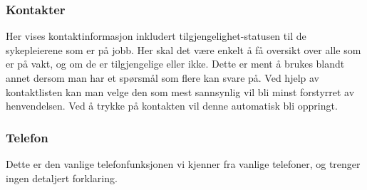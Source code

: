 \subsubsection{Kontakter}
Her vises kontaktinformasjon inkludert tilgjengelighet-statusen til de sykepleierene som er på jobb. Her skal det være enkelt å få oversikt over alle som er på vakt, og om de er tilgjengelige eller ikke. Dette er ment å brukes blandt annet dersom man har et spørsmål som flere kan svare på. Ved hjelp av kontaktlisten kan man velge den som mest sannsynlig vil bli minst forstyrret av henvendelsen. Ved å trykke på kontakten vil denne automatisk bli oppringt.

\subsubsection{Telefon}
Dette er den vanlige telefonfunksjonen vi kjenner fra vanlige telefoner, og trenger ingen detaljert forklaring.



